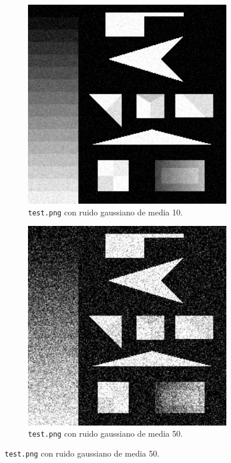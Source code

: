 \documentclass[11pt, spanish]{article}
\begin{document}
\begin{figure}[H]
\centering
\begin{subfigure}{0.5\linewidth}
\centering
  \includegraphics[height=9cm]{ej1-imgs/test-gauss10.png}
  \caption{\footnotesize{\texttt{test.png} con ruido gaussiano de media 10.}}
\end{subfigure}%
\begin{subfigure}{0.5\linewidth}
\centering
  \includegraphics[height=9cm]{ej1-imgs/test-gauss50.png}
  \caption{\footnotesize{\texttt{test.png} con ruido gaussiano de media 50.}}
\end{subfigure}
\end{figure}
\end{document}
